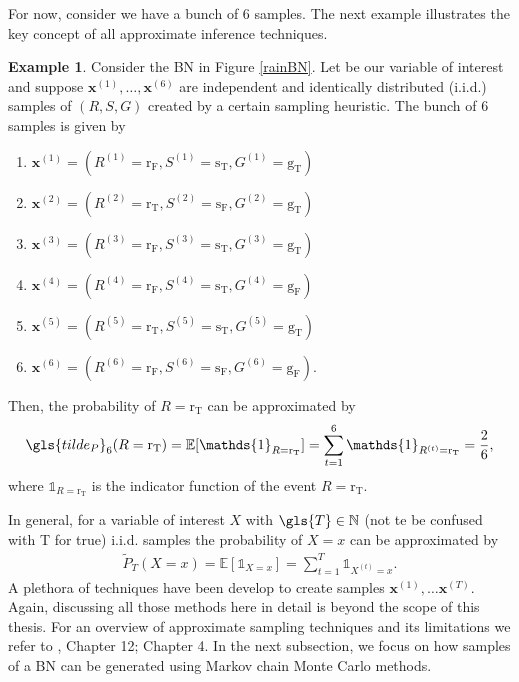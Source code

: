 \documentclass[a4paper, twoside, 11pt]{report}
\newcommand{\bfx}{{\mathbf{x}}}
\theoremstyle{plain}
\theoremstyle{definition}
\newtheorem{example}[thm]{Example}
\theoremstyle{remark}
\newcommand{\E}{{\mathbb E}}
\newcommand{\gT}{{\text{g}_\text{T} }}
\newcommand{\gF}{{\text{g}_\text{F} }}
\newcommand{\sT}{{\text{s}_\text{T} }}
\newcommand{\sF}{{\text{s}_\text{F} }}
\newcommand{\rr}{{\text{r} }}
\newcommand{\rT}{{\text{r}_\text{T} }}
\newcommand{\rF}{{\text{r}_\text{F} }}
\def\N{{\mathbb N}}
\begin{document}
For now, consider we have a bunch of $6$ samples. The next example illustrates the key concept of all approximate inference techniques.
\begin{example}\label{ex:sampling}
Consider the BN in Figure \ref{rainBN}. Let \rr be our variable of interest and suppose $\bfx^{(1)}, \ldots , \bfx^{(6)}$ are independent and identically distributed (i.i.d.) samples of $(R, S, G)$ created by a certain sampling heuristic. The bunch of $6$ samples is given by
\begin{multicols}{2}
\begin{enumerate}
\item $\bfx^{(1)} = ( R^{(1)} = \rF, S^{(1)} = \sT,  G^{(1)} = \gT)$
\item $\bfx^{(2)} = ( R^{(2)} = \rT, S^{(2)} = \sF,  G^{(2)} = \gT)$
\item $\bfx^{(3)} = ( R^{(3)} = \rF, S^{(3)} = \sT,  G^{(3)} = \gT)$
\item $\bfx^{(4)} = ( R^{(4)} = \rF, S^{(4)} = \sT,  G^{(4)} = \gF )$
\item $\bfx^{(5)} = ( R^{(5)} = \rT, S^{(5)} = \sT,  G^{(5)} = \gT)$
\item $\bfx^{(6)} = ( R^{(6)} = \rF, S^{(6)} = \sF,  G^{(6)} = \gF)$.
\end{enumerate}
\end{multicols}
\noindent Then, the probability of $R = \text{r}_\text{T}$ can be approximated by 
\begin{align*}
\gls{tilde_P}_6(R = \rT) = \E[ \mathds{1}_{R = \rT} ] = \sum_{t=1}^6 \mathds{1}_{R^{(t)} = \rT} = \frac{2}{6},
\end{align*}
where $\mathds{1}_{R = \rT}$ is the indicator function of the event $R = \rT$.
\end{example}
In general, for a variable of interest $X$ with $\gls{T} \in \N$ (not te be confused with T  for true) i.i.d. samples the probability of $X = x$ can be approximated by 
\begin{align*}
\widetilde{P}_T(X = x) = \E[ \mathds{1}_{X=x} ] = \sum_{t=1}^T \mathds{1}_{X^{(t)} = x}.
\end{align*}
A plethora of techniques have been develop to create samples $\bfx^{(1)}, \ldots \bfx^{(T)}$. Again, discussing all those methods here in detail is beyond the scope of this thesis. For an overview of approximate sampling techniques and its limitations we refer to \cite{koller2009probabilistic}, Chapter 12; \cite{nielsen2009bayesian} Chapter 4. In the next subsection, we focus on how samples of a BN can be generated using Markov chain Monte Carlo methods. 
\end{document}
